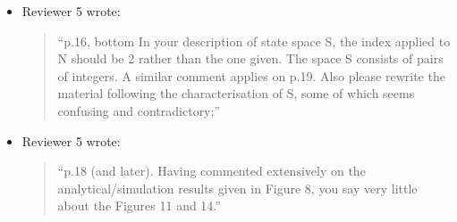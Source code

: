 \documentclass{article}
\begin{document}
\begin{itemize}
\item Reviewer 5 wrote:
\begin{quote}
``p.16, bottom In your description of state space S, the index applied to N should be 2 rather than the one given. The space S consists of pairs of integers. A similar comment applies on p.19. Also please rewrite the material following the characterisation of S, some of which seems confusing and contradictory;''
\end{quote}


\item Reviewer 5 wrote:
\begin{quote}
``p.18 (and later). Having commented extensively on the analytical/simulation results given in Figure 8, you say very little about the Figures 11 and 14.''
\end{quote}


\end{itemize}
\end{document}
